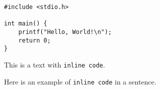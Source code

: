 

\captionsetup[lstlisting]{labelformat=empty}    %


\begin{lstlisting}[style=mystyle, caption={Ein einfacher C-Code}]
#include <stdio.h>

int main() {
    printf("Hello, World!\n");
    return 0;
}
\end{lstlisting}





This is a text with \texttt{inline code}.

Here is an example of \lstinline{inline code} in a sentence.